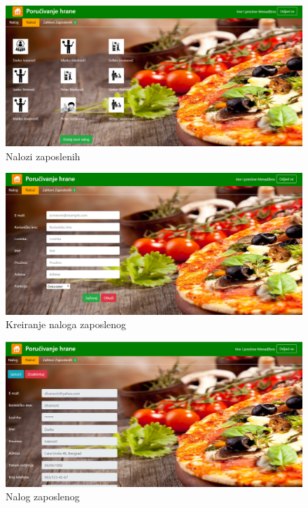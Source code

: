  \begin{figure}[!h]
    \includegraphics[width=1\textwidth]{slike/menadzer_nalozi.PNG}
    \caption{Nalozi zaposlenih} %
    \label{fig:slika_nalozi}
\end{figure}

 \begin{figure}[!h]
    \includegraphics[width=1\textwidth]{slike/menadzer_noviNalog.PNG}
    \caption{Kreiranje naloga zaposlenog} %
    \label{fig:slika_nalozi}
\end{figure}

\begin{figure}[!h]
    \includegraphics[width=1\textwidth]{slike/menadzer_nalog.PNG}
    \caption{Nalog zaposlenog} %
    \label{fig:slika_nalog}
\end{figure}

